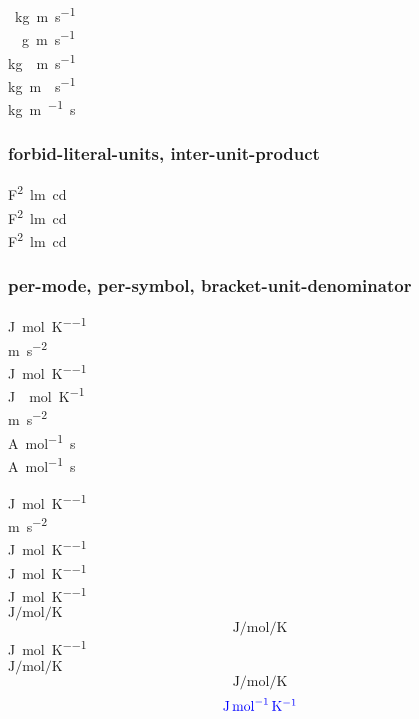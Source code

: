 \documentclass{article}
\begin{document}
\si{\cancel\kilo\gram\metre\per\second} \\
\si{\kilo\cancel\gram\metre\per\second} \\
\si{\kilo\gram\cancel\metre\per\second} \\
\si{\kilo\gram\metre\cancel\per\second} \\
\si{\kilo\gram\metre\per\cancel\second} \\

\subsubsection{forbid-literal-units, inter-unit-product}
\si{\farad\squared\lumen\candela} \\
\si[inter-unit-product = \ensuremath{{}\cdot{}}]{\farad\squared\lumen\candela}\\
\si[color=blue,inter-unit-product = \ensuremath{{}\cdot{}}]{\farad\squared\lumen\candela}\\
\subsubsection{per-mode, per-symbol, bracket-unit-denominator}
\si{\joule\per\mole\per\kelvin} \\
\si{\metre\per\second\squared} \\
\si[per-mode=fraction]{\joule\per\mole\per\kelvin} \\
\si[per-mode=fraction]{\joule{}\mole\per\kelvin} \\
\si[per-mode=fraction]{\metre\per\second\squared}\\
\si{\ampere\per\mole\second} \\
\si[per-mode = reciprocal-positive-first]{\ampere\per\mole\second}

{
%
\si{\joule\per\mole\per\kelvin} \\
\si{\metre\per\second\squared} \\
\si[per-symbol = \text{~div~}]{\joule\per\mole\per\kelvin} \\
\si[bracket-unit-denominator = false]{\joule\per\mole\per\kelvin}\\
}
\si[per-mode=repeated-symbol]{\joule\per\mole\per\kelvin}\\
{
%
\( \si{\joule\per\mole\per\kelvin} \)
\[ \si{\joule\per\mole\per\kelvin} \]
\si{\joule\per\mole\per\kelvin} \\
\(
\displaystyle
\si{\joule\per\mole\per\kelvin}
\)
\[
\textstyle
\si{\joule\per\mole\per\kelvin}
\]
\[
\textstyle
\si[color=blue]{\joule\per\mole\per\kelvin}
\]
}
\end{document}
